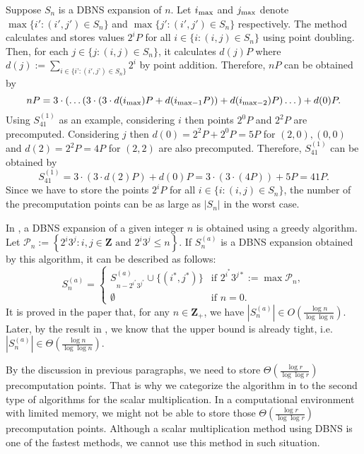 Suppose $S_n$ is a DBNS expansion of $n$. Let $i_{\rm max}$ and $j_{\rm max}$ denote $\max\{ i' : (i',j') \in S_n \}$ and $\max\{ j' : (i',j') \in S_n \}$ respectively.
The method \cite{MH09} calculates and stores values $2^iP$ for all $i \in \{i : (i, j) \in S_n \}$ using point doubling.
Then, for each $j \in \{j : (i, j) \in S_n \}$, it calculates $d(j)P$ where $d(j) := \sum\limits_{i \in \{i’ : (i',j’) \in S_n\}} 2^i $ by point addition.
Therefore, $nP$ can be obtained by
$$nP = 3\cdot \left( \dots \left( 3 \cdot \left( 3 \cdot d(i_{\rm max})P + d(i_{\mathrm{max} - 1}P) \right) + d(i_{\mathrm{max} - 2})P \right) \dots \right) + d(0)P.$$
Using $S_{41}^{(1)}$ as an example, considering $i$ then points $2^0P$ and $2^2P$ are precomputed.
Considering $j$ then $d(0) = 2^2P + 2^0P = 5P$ for $(2,0),(0,0)$ and $d(2) = 2^2P = 4P$ for $(2,2)$ are also precomputed.
Therefore, $S_{41}^{(1)}$ can be obtained by
$$S_{41}^{(1)} = 3 \cdot \left( 3 \cdot d(2)P  \right) + d(0)P = 3 \cdot \left( 3 \cdot \left( 4P \right)  \right) + 5P = 41P.$$
Since we have to store the points $2^iP$ for all $i \in \{i : (i,j) \in S_n\}$, the number of the precomputation points can be as large as $|S_n|$ in the worst case.

In \cite{dbns2}, a DBNS expansion of a given integer $n$ is obtained using a greedy algorithm.
Let $\mathcal{P}_n := \left\{ 2^i3^j : i,j \in \mathbf{Z} \text{ and } 2^i3^j \leq n \right\}$.
If $S^{(a)}_n$ is a DBNS expansion obtained by this algorithm,
it can be described as follows:
\[
S^{(a)}_n =
\begin{cases}
S^{(a)}_{n - 2^{i^*}3^{j^*}} \cup \{(i^*, j^*)\} & \text{if } 2^{i^*}3^{j*} := \max \mathcal{P}_n, \\
\emptyset       & \text{if } n = 0.
\end{cases}
\]
It is proved in the paper that, for any $n \in \mathbf{Z}_+$, we have $\left|S_n^{(a)}\right| \in O(\frac{\log n}{\log \log n})$.
Later, by the result in \cite{dbns3}, we know that the upper bound is already tight, i.e. $\left|S_n^{(a)}\right| \in \Theta(\frac{\log n}{\log \log n})$.

By the discussion in previous paragraphs, we need to store $\Theta(\frac{\log r}{\log \log r})$ precomputation points.
That is why we categorize the algorithm in \cite{MH09} to the second type of algorithms for the scalar multiplication.
In a computational environment with limited memory, we might not be able to store those $\Theta(\frac{\log r}{\log \log r})$ precomputation points.
Although a scalar multiplication method using DBNS is one of the fastest methods, we cannot use this method in such situation.

